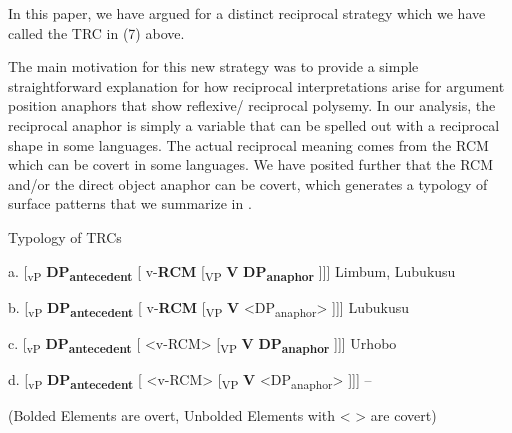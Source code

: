 \documentclass[output=paper]{langsci/langscibook}
\begin{document}
  In this paper, we have argued for a distinct reciprocal strategy which we have called the TRC in (7) above. 

The main motivation for this new strategy was to provide a simple straightforward explanation for how reciprocal interpretations arise for argument position anaphors that show reflexive/ reciprocal polysemy. In our analysis, the reciprocal anaphor is simply a variable that can be spelled out with a reciprocal shape in some languages. The actual reciprocal meaning comes from the RCM which can be covert in some languages. We have posited further that the RCM and/or the direct object anaphor can be covert, which generates a typology of surface patterns that we summarize in .
 
\begin{table}
\caption{Typology of TRCs}


  a.  [\textsubscript{vP} \textbf{DP}\textbf{\textsubscript{antecedent}} [ v-\textbf{RCM}   [\textsubscript{VP} \textbf{V}  \textbf{DP}\textbf{\textsubscript{anaphor}} ]]]     Limbum, Lubukusu



  b.  [\textsubscript{vP} \textbf{DP}\textbf{\textsubscript{antecedent}} [ v-\textbf{RCM}   [\textsubscript{VP} \textbf{V}  <DP\textsubscript{anaphor}> ]]]    Lubukusu  



  c.  [\textsubscript{vP} \textbf{DP}\textbf{\textsubscript{antecedent}} [ <v-RCM>   [\textsubscript{VP} \textbf{V}  \textbf{DP}\textbf{\textsubscript{anaphor}} ]]]    Urhobo



  d.  [\textsubscript{vP} \textbf{DP}\textbf{\textsubscript{antecedent}} [ <v-RCM>   [\textsubscript{VP} \textbf{V}  <DP\textsubscript{anaphor}> ]]]    --



    (Bolded Elements are overt, Unbolded Elements with < > are covert)

\label{tab:1}
\end{table} 
\end{document}
